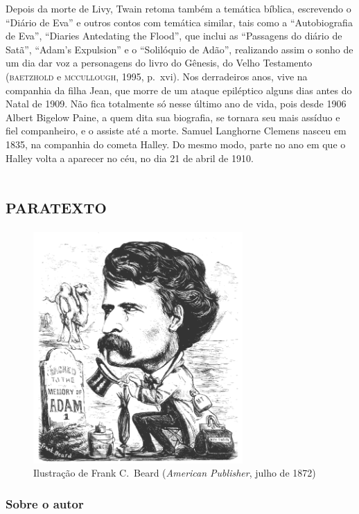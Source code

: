 Depois da morte de Livy, Twain retoma também a temática bíblica, escrevendo o
``Diário de Eva'' e outros contos com temática similar, tais como a
“Autobiografia de Eva”, “Diaries Antedating the Flood”, que inclui as
“Passagens do diário de Satã”, “Adam’s Expulsion” e o “Solilóquio de Adão”,
realizando assim o sonho de um dia dar voz a personagens do
livro do Gênesis, do Velho Testamento (\textsc{baetzhold} e \textsc{mccullough}, 1995, p.~xvi).
Nos derradeiros anos, vive na companhia da filha Jean, que morre de um ataque
epiléptico alguns dias antes do Natal de 1909. Não fica totalmente só
nesse último ano de vida, pois desde 1906 Albert Bigelow Paine, a quem
dita sua biografia, se tornara seu mais assíduo e fiel companheiro, e o
assiste até a morte. Samuel Langhorne Clemens nasceu em 1835, na companhia
do cometa Halley. Do mesmo modo, parte no ano em que o Halley volta a
aparecer no céu, no dia 21 de abril de 1910.


\part{\textsc{paratexto}}

\thispagestyle{empty}
\begin{figure}\begin{center}
	\includegraphics[width=8cm]{img1.png}
	\caption{Ilustração de Frank C.~Beard (\emph{American Publisher}, julho de 1872)}
\end{center}\end{figure}%


\section{Sobre o autor}

